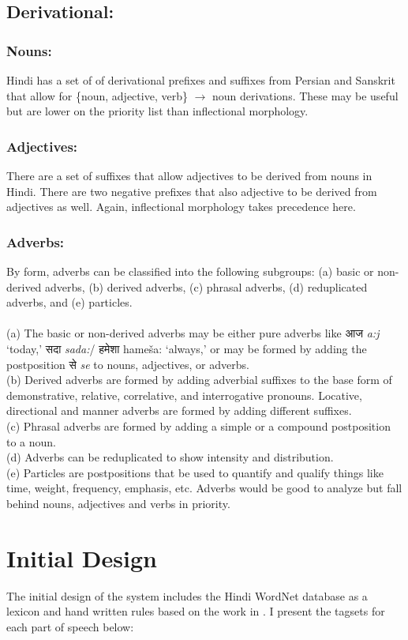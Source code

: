 \documentclass[11pt,letterpaper]{article}
\begin{document}
\subsection{Derivational:}
\subsubsection{Nouns:}
Hindi has a set of of derivational prefixes and suffixes from Persian and Sanskrit that allow for \{noun, adjective, verb\} $\rightarrow$ noun derivations. These may be useful but are lower on the priority list than inflectional morphology.
\subsubsection{Adjectives:}
There are a set of suffixes that allow adjectives to be derived from nouns in Hindi. There are two negative prefixes that also adjective to be derived from adjectives as well. Again, inflectional morphology takes precedence here.
\subsubsection{Adverbs:}
By form, adverbs can be classified into the following subgroups: (a)
basic or non-derived adverbs, (b) derived adverbs, (c) phrasal
adverbs, (d) reduplicated adverbs, and (e) particles.\\
\\
(a) The basic or non-derived adverbs may be either pure adverbs like
आज \textit{a:j} ‘today,’ सदा \textit{sada:}/ हमेशा hameša: ‘always,’ or may be formed
by adding the postposition से \textit{se} to nouns, adjectives, or adverbs.\\
(b) Derived adverbs are formed by adding adverbial suffixes to the
base form of demonstrative, relative, correlative, and interrogative
pronouns. Locative, directional and manner adverbs are formed by adding different suffixes.\\
(c) Phrasal adverbs are formed by adding a simple or a compound
postposition to a noun.\\
(d) Adverbs can be reduplicated to show intensity and distribution.\\
(e) Particles are postpositions that be used to quantify and qualify things like time, weight, frequency, emphasis, etc.
Adverbs would be good to analyze but fall behind nouns, adjectives and verbs in priority.
\section{Initial Design}
The initial design of the system includes the Hindi WordNet database as a lexicon and hand written rules based on the work in \cite{koul}. I present the tagsets for each part of speech below:\\
\end{document}
